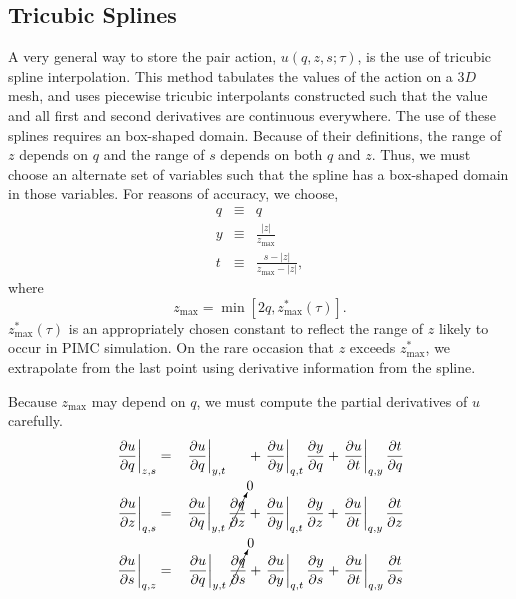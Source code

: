 \documentclass{article}
\begin{document}
\subsection{Tricubic Splines}
A very general way to store the pair action, $u(q,z,s;\tau)$, is the
use of tricubic spline interpolation.  This method tabulates the
values of the action on a $3D$ mesh, and uses piecewise tricubic
interpolants constructed such that the value and all first and second
derivatives are continuous everywhere.  The use of these splines
requires an box-shaped domain.  Because of their definitions, the
range of $z$ depends on $q$ and the range of $s$ depends on both $q$
and $z$.  Thus, we must choose an alternate set of variables such that
the spline has a box-shaped domain in those variables.  For reasons of
accuracy, we choose,
\begin{eqnarray}
q & \equiv & q \\
y & \equiv & \frac{|z|}{z_\text{max}} \\
t & \equiv & \frac{s-|z|}{z_\text{max}-|z|},
\end{eqnarray}
where
\begin{equation}
z_\text{max} = \min \left[2q, z^*_\text{max}(\tau)\right].
\end{equation}
$z^*_\text{max}(\tau)$ is an appropriately chosen constant to reflect
the range of $z$ likely to occur in PIMC simulation.  On the rare
occasion that $z$ exceeds $z^*_\text{max}$, we extrapolate from the
last point using derivative information from the spline.

Because $z_\text{max}$ may depend on $q$, we must compute the partial
derivatives of $u$ carefully.
\begin{eqnarray}
\left.\frac{\partial u}{\partial q}\right|_{z,s} & = & 
\left.\frac{\partial u}{\partial q}\right|_{y,t} \ \ \ \ \, + 
\left.\frac{\partial u}{\partial y}\right|_{q,t} \frac{\partial y}{\partial q}+
\left.\frac{\partial u}{\partial t}\right|_{q,y} \frac{\partial t}{\partial q} \\
\left.\frac{\partial u}{\partial z}\right|_{q,s} & = & 
\left.\frac{\partial u}{\partial q}\right|_{y,t} \cancelto{0}{\frac{\partial q}{\partial z}}+
\left.\frac{\partial u}{\partial y}\right|_{q,t} \frac{\partial y}{\partial z}+
\left.\frac{\partial u}{\partial t}\right|_{q,y} \frac{\partial t}{\partial z} \\
\left.\frac{\partial u}{\partial s}\right|_{q,z} & = & 
\left.\frac{\partial u}{\partial q}\right|_{y,t} \cancelto{0}{\frac{\partial q}{\partial s}}+
\left.\frac{\partial u}{\partial y}\right|_{q,t} \frac{\partial y}{\partial s}+
\left.\frac{\partial u}{\partial t}\right|_{q,y} \frac{\partial t}{\partial s} \\
\end{eqnarray}
\end{document}
